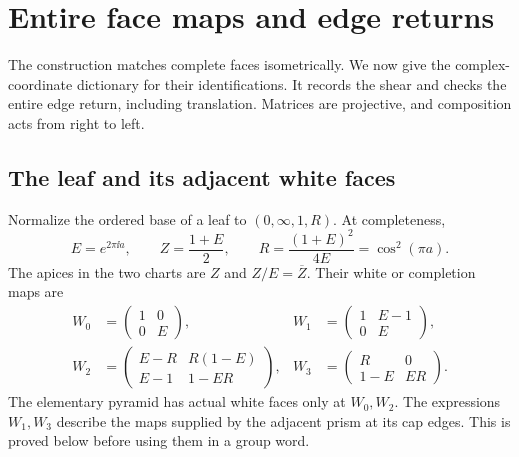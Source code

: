 \section{Entire face maps and edge returns}
\label{cg:maps}

The construction matches complete faces isometrically. We now
give the complex-coordinate dictionary for their identifications.
It records the shear and checks the entire edge return, including
translation. Matrices are projective, and composition acts from
right to left.

\subsection{The leaf and its adjacent white faces}
Normalize the ordered base of a leaf to $(0,\infty,1,R)$.
At completeness,
\begin{equation}\label{cg:normalized}
 E=e^{2\pi\ii a},\qquad Z=\frac{1+E}{2},\qquad
 R=\frac{(1+E)^2}{4E}=\cos^2(\pi a).
\end{equation}
The apices in the two charts are $Z$ and $Z/E=\overline Z$.
Their white or completion maps are
\begin{equation}\label{cg:white}
\begin{aligned}
 W_0&=\begin{pmatrix}1&0\\0&E\end{pmatrix},&
 W_1&=\begin{pmatrix}1&E-1\\0&E\end{pmatrix},\\
 W_2&=\begin{pmatrix}E-R&R(1-E)\\E-1&1-ER\end{pmatrix},&
 W_3&=\begin{pmatrix}R&0\\1-E&ER\end{pmatrix}.
\end{aligned}
\end{equation}
The elementary pyramid has actual white faces only at $W_0,W_2$.
The expressions $W_1,W_3$ describe the maps supplied by the
adjacent prism at its cap edges. This is proved below before
using them in a group word.

